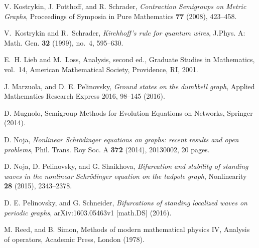 \documentclass[11pt,a4paper]{amsart}
\theoremstyle{definition}
\numberwithin{equation}{section}
\begin{document}
\begin{thebibliography}{99}
{ V. Kostrykin, J. Potthoff, and R. Schrader, \emph{Contraction Semigroups on Metric Graphs}, 
Proceedings of Symposia in Pure Mathematics \textbf{77} (2008), 423--458.

\bibitem{[KS99]} V.~Kostrykin and R.~Schrader, \emph{{K}irchhoff's rule for quantum wires}, J.Phys. A: Math. Gen. \textbf{32} (1999), no.~4, 595--630.

E.~H. Lieb and M.~Loss, Analysis, second ed., Graduate Studies in
  Mathematics, vol.~14, American Mathematical Society, Providence, RI, 2001.

\bibitem{[MP16]}  J. Marzuola, and D. E. Pelinovsky, \emph{Ground states on the dumbbell graph}, Applied Mathematics Research Express 2016, 98--145 (2016).
  
 D. Mugnolo, Semigroup Methods for Evolution Equations on Networks, Springer (2014).

 D. Noja, \emph{Nonlinear Schr\"odinger equations on graphs:
recent results and open problems}, Phil. Trans. Roy Soc. A {\bf 372} (2014), 20130002,
20 pages.

\bibitem{[NPS15]} D. Noja, D. Pelinovsky, and G. Shaikhova, \emph{Bifurcation and stability of standing waves in the nonlinear Schr\"odinger
equation on the tadpole graph}, Nonlinearity {\bf 28} (2015), 2343--2378.

\bibitem{[PS16]} D. E. Pelinovsky, and G. Schneider, \emph{Bifurcations of standing localized waves on periodic graphs},  arXiv:1603.05463v1 [math.DS] (2016).

 M. Reed, and B. Simon, Methods of modern mathematical physics IV, Analysis of operators, Academic Press, London (1978).}
\end{thebibliography}
\end{document}
